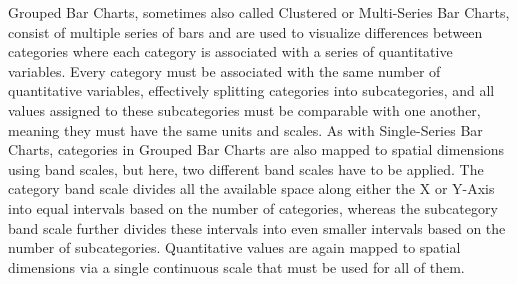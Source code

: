 Grouped Bar Charts, sometimes also called Clustered or Multi-Series
Bar Charts, consist of multiple series of bars and are used to
visualize differences between categories where each category is
associated with a series of quantitative variables.  Every category
must be associated with the same number of quantitative variables,
effectively splitting categories into subcategories, and all values
assigned to these subcategories must be comparable with one another,
meaning they must have the same units and scales.  As with
Single-Series Bar Charts, categories in Grouped Bar Charts are also
mapped to spatial dimensions using band scales, but here, two
different band scales have to be applied.  The category band scale
divides all the available space along either the X or Y-Axis into
equal intervals based on the number of categories, whereas the
subcategory band scale further divides these intervals into even
smaller intervals based on the number of subcategories.  Quantitative
values are again mapped to spatial dimensions via a single continuous
scale that must be used for all of them.


